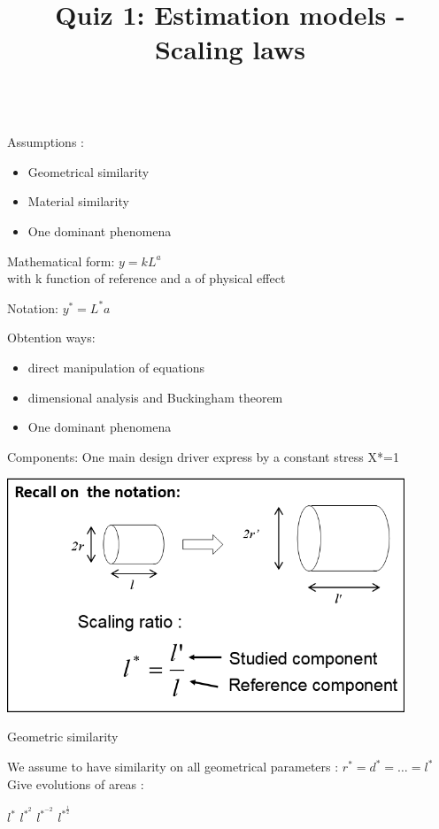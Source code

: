 \documentclass{webquiz}
\title{Quiz 1: Estimation models - Scaling laws}
\begin{document}
 
 
     \begin{discussion}\\ 
     \newline
       Assumptions : 
     \begin{minipage}[t]{.8\textwidth}
    \begin{itemize} 
     \item  Geometrical similarity  
     \item  Material similarity
     \item  One dominant phenomena
     \end{itemize}
      \end{minipage}
  

	Mathematical form:		$y=kL^a $ \\
				with k function of reference and  a of physical effect

Notation:			$y^*=L^*a$

Obtention ways:	
\begin{minipage}[t]{.8\textwidth}
\begin{itemize} 
     \item  direct manipulation of equations 
     \item  dimensional analysis and Buckingham theorem
     \item  One dominant phenomena
     \end{itemize}
\end{minipage}
Components:           One main design driver express by a constant stress X*=1
\begin{center}
	\includegraphics[height=70mm]{Picture1.png}
\end{center}
     \end{discussion} 
 
  
   \begin{question} 
          \begin{center}
	\large{Geometric similarity}
\end{center}
    We assume to have similarity on all geometrical parameters :  $r^* = d^* = …=  l^*$ \\
    \newline
	Give evolutions of areas : 
     \begin{choice}
      \incorrect  $ l^*$
      \incorrect  $ l^{*^2}$ 
      \incorrect $ l^{*^{-2}}$ 
      \correct  $ l^{*^{\frac{1}{2}}}$ 
     \end{choice} 
   \end{question}
     
\end{document}
